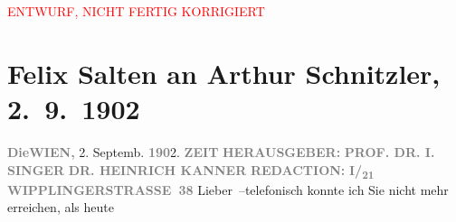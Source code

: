 
\begin{center}
            \textcolor{red}{ENTWURF, NICHT FERTIG KORRIGIERT}
                      \end{center}
            
         
         \renewcommand{\erwaehntePersonen}{Personen: Heinrich Kanner, Isidor Singer}
         \renewcommand{\erwaehnteInstitutionen}{Institutionen: Die Zeit}
         \renewcommand{\erwaehnteOrte}{Orte: Niederösterreich, Steiermark, Wien, Wipplingerstraße}
         \renewcommand{\erwaehnteWerke}{Werke: Die Zeit, Die griechische Tänzerin. Novellette}
               \section[Felix Salten an Arthur Schnitzler, 2. 9. 1902]{ Felix Salten an Arthur Schnitzler, 2. 9. 1902}\nopagebreak{}\rehead{ }\begin{ledgroupsized}[t]{13cm}\normalsize\beginnumbering \toendnotes[C]{\smallbreak\pagebreak[2]} 
\toendnotes[C]{\smallbreak}\pstart
           \noindent{}{\pb}\textcolor{gray}{\textbf{Die}}\hfill \textcolor{gray}{\textbf{WIEN,}}{ }2. Septemb. \textcolor{gray}{\textbf{190}}2.\pend
           \pstart
           \textcolor{gray}{\textbf{ZEIT}}\pend
           \pstart
           \textcolor{gray}{\textbf{HERAUSGEBER:}}\pend
           \pstart
           \textcolor{gray}{\textbf{PROF. DR. I. SINGER}}\pend
           \pstart
           \textcolor{gray}{\textbf{DR. HEINRICH KANNER}}\pend
           \pstart
           \textcolor{gray}{\textbf{REDACTION:}}\pend
           \pstart
           \textcolor{gray}{\textbf{I/\textsubscript{21}
                           WIPPLINGERSTRASSE 38}}\pend
           \pstart
           Lieber –telefonisch konnte ich Sie nicht mehr erreichen, als heute

\end{ledgroupsized}
